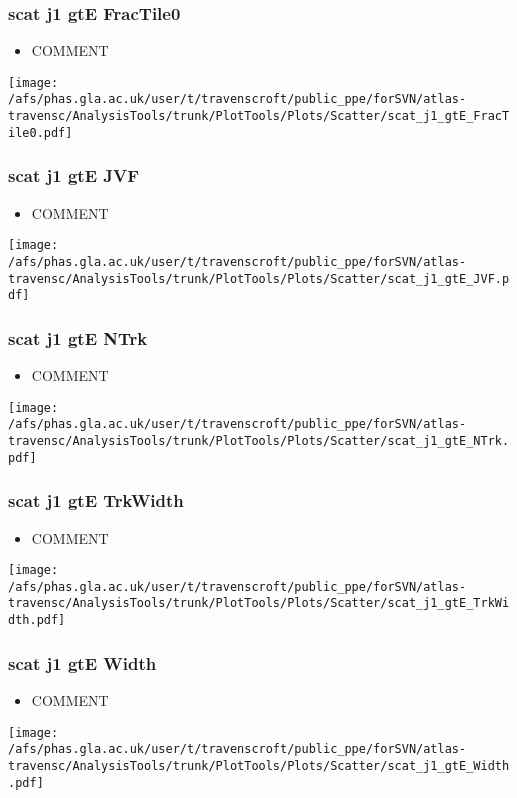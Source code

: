 \documentclass{beamer}
\begin{document}
\begin{frame}
\frametitle{scat j1 gtE FracTile0}
\begin{itemize}
\item COMMENT
\end{itemize}
\begin{center}
\texttt{[image: /afs/phas.gla.ac.uk/user/t/travenscroft/public\_ppe/forSVN/atlas-travensc/AnalysisTools/trunk/PlotTools/Plots/Scatter/scat\_j1\_gtE\_FracTile0.pdf]}
\end{center}
\end{frame}

\begin{frame}
\frametitle{scat j1 gtE JVF}
\begin{itemize}
\item COMMENT
\end{itemize}
\begin{center}
\texttt{[image: /afs/phas.gla.ac.uk/user/t/travenscroft/public\_ppe/forSVN/atlas-travensc/AnalysisTools/trunk/PlotTools/Plots/Scatter/scat\_j1\_gtE\_JVF.pdf]}
\end{center}
\end{frame}

\begin{frame}
\frametitle{scat j1 gtE NTrk}
\begin{itemize}
\item COMMENT
\end{itemize}
\begin{center}
\texttt{[image: /afs/phas.gla.ac.uk/user/t/travenscroft/public\_ppe/forSVN/atlas-travensc/AnalysisTools/trunk/PlotTools/Plots/Scatter/scat\_j1\_gtE\_NTrk.pdf]}
\end{center}
\end{frame}

\begin{frame}
\frametitle{scat j1 gtE TrkWidth}
\begin{itemize}
\item COMMENT
\end{itemize}
\begin{center}
\texttt{[image: /afs/phas.gla.ac.uk/user/t/travenscroft/public\_ppe/forSVN/atlas-travensc/AnalysisTools/trunk/PlotTools/Plots/Scatter/scat\_j1\_gtE\_TrkWidth.pdf]}
\end{center}
\end{frame}

\begin{frame}
\frametitle{scat j1 gtE Width}
\begin{itemize}
\item COMMENT
\end{itemize}
\begin{center}
\texttt{[image: /afs/phas.gla.ac.uk/user/t/travenscroft/public\_ppe/forSVN/atlas-travensc/AnalysisTools/trunk/PlotTools/Plots/Scatter/scat\_j1\_gtE\_Width.pdf]}
\end{center}
\end{frame}
\end{document}
